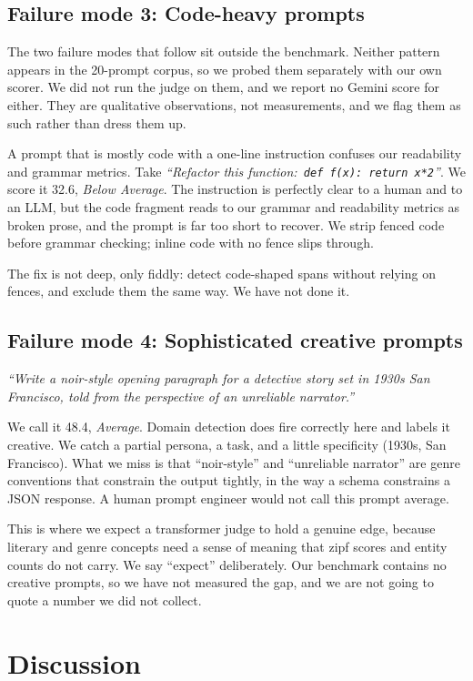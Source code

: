 \documentclass[conference]{IEEEtran}
\begin{document}
\subsection{Failure mode 3: Code-heavy prompts}
The two failure modes that follow sit outside the benchmark. Neither pattern appears in the 20-prompt corpus, so we probed them separately with our own scorer. We did not run the judge on them, and we report no Gemini score for either. They are qualitative observations, not measurements, and we flag them as such rather than dress them up.

A prompt that is mostly code with a one-line instruction confuses our readability and grammar metrics. Take \emph{``Refactor this function:\ \texttt{def f(x): return x*2}''}. We score it 32.6, \emph{Below Average}. The instruction is perfectly clear to a human and to an LLM, but the code fragment reads to our grammar and readability metrics as broken prose, and the prompt is far too short to recover. We strip fenced code before grammar checking; inline code with no fence slips through.

The fix is not deep, only fiddly: detect code-shaped spans without relying on fences, and exclude them the same way. We have not done it.

\subsection{Failure mode 4: Sophisticated creative prompts}
\emph{``Write a noir-style opening paragraph for a detective story set in 1930s San Francisco, told from the perspective of an unreliable narrator.''}

We call it 48.4, \emph{Average}. Domain detection does fire correctly here and labels it creative. We catch a partial persona, a task, and a little specificity (1930s, San Francisco). What we miss is that ``noir-style'' and ``unreliable narrator'' are genre conventions that constrain the output tightly, in the way a schema constrains a JSON response. A human prompt engineer would not call this prompt average.

This is where we expect a transformer judge to hold a genuine edge, because literary and genre concepts need a sense of meaning that zipf scores and entity counts do not carry. We say ``expect'' deliberately. Our benchmark contains no creative prompts, so we have not measured the gap, and we are not going to quote a number we did not collect.

\section{Discussion}
\end{document}
